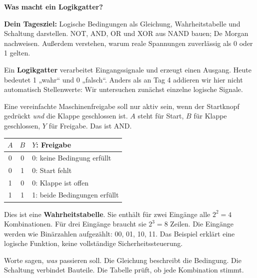 \documentclass[10pt,a4paper]{article}
\newcommand{\titlepagepart}[2]{\vspace*{-4mm}{\sffamily\small #1}\par{\sffamily\LARGE\bfseries #2}\par\vspace{2mm}}
\newcommand{\block}[1]{\par\vspace{2mm}{\sffamily\large\bfseries #1}\par}
\begin{document}
\titlepagepart{01 / DER EINSTIEG}{Was macht ein Logikgatter?}
\textbf{Dein Tagesziel:} Logische Bedingungen als Gleichung, Wahrheitstabelle
und Schaltung darstellen. NOT, AND, OR und XOR aus NAND bauen; De Morgan
nachweisen. Außerdem verstehen, warum reale Spannungen zuverlässig als 0 oder 1 gelten.

Ein \textbf{Logikgatter} verarbeitet Eingangssignale und erzeugt einen Ausgang.
Heute bedeutet 1 „wahr“ und 0 „falsch“. Anders als an Tag 4 addieren wir hier
nicht automatisch Stellenwerte: Wir untersuchen zunächst einzelne logische Signale.

\block{Ein Beispiel: Zwei Bedingungen müssen erfüllt sein}
Eine vereinfachte Maschinenfreigabe soll nur aktiv sein, wenn der Startknopf
gedrückt \emph{und} die Klappe geschlossen ist. $A$ steht für Start,
$B$ für Klappe geschlossen, $Y$ für Freigabe. Das ist AND.
\begin{center}
\end{center}
\begin{center}
\begin{tabular}{ccl}\toprule
$A$&$B$&$Y$: Freigabe\\\midrule
0&0&0: keine Bedingung erfüllt\\
0&1&0: Start fehlt\\
1&0&0: Klappe ist offen\\
1&1&1: beide Bedingungen erfüllt\\\bottomrule
\end{tabular}
\end{center}
Dies ist eine \textbf{Wahrheitstabelle}. Sie enthält für zwei Eingänge alle
$2^2=4$ Kombinationen. Für drei Eingänge braucht sie $2^3=8$ Zeilen.
Die Eingänge werden wie Binärzahlen aufgezählt: 00, 01, 10, 11.
Das Beispiel erklärt eine logische Funktion, keine vollständige Sicherheitssteuerung.

\block{Vier Darstellungen derselben Funktion}
\begin{center}
\end{center}
Worte sagen, \emph{was} passieren soll. Die Gleichung beschreibt die Bedingung.
Die Schaltung verbindet Bauteile. Die Tabelle prüft, ob jede Kombination stimmt.
\end{document}
